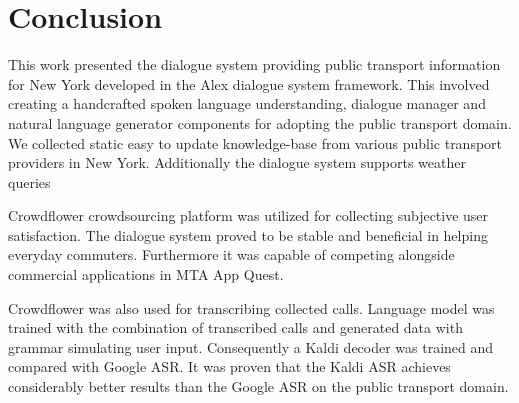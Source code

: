 \chapter*{Conclusion}

This work presented the dialogue system providing public transport information for New York developed in the Alex dialogue system framework.
This involved creating a handcrafted spoken language understanding, dialogue manager and natural language generator components for adopting the public transport domain.
We collected static easy to update knowledge-base from various public transport providers in New York.
Additionally the dialogue system supports weather queries 

Crowdflower crowdsourcing platform was utilized for collecting subjective user satisfaction.
The dialogue system proved to be stable and beneficial in helping everyday commuters.
Furthermore it was capable of competing alongside commercial applications in MTA App Quest.

Crowdflower was also used for transcribing collected calls.
Language model was trained with the combination of transcribed calls and generated data with grammar simulating user input.
Consequently a Kaldi decoder was trained and compared with Google ASR.
It was proven that the Kaldi ASR achieves considerably better results than the Google ASR on the public transport domain.


